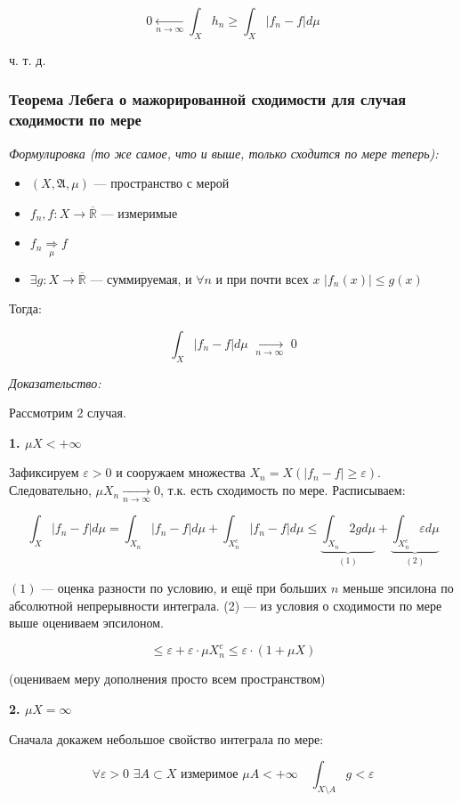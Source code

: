 \documentclass{article}
\def\dbl{\,\,}
\def\rinf{\overline{\mathbb{R}}}
\def\goesto#1{\underset{#1}{\longrightarrow}}
\def\toinf#1{\goesto{#1 \rightarrow \infty}}
\def\ntoinf{\toinf{n}}
\begin{document}
\[0 \underset{n \rightarrow \infty}{\longleftarrow} \int_{X} h_n \ge \int_{X} |f_n - f| d \mu\]

ч. т. д. 

\subsubsection{Теорема Лебега о мажорированной сходимости для случая сходимости по мере}
\textit{Формулировка (то же самое, что и выше, только сходится по мере теперь):}

\begin{itemize}
    \item $(X, \mathfrak{A}, \mu)$ --- пространство с мерой
    \item $f_n, f: X \rightarrow \rinf$ --- измеримые
    \item $f_n \underset{\mu}{\Longrightarrow} f$
    \item $\exists g: X \rightarrow \rinf$ --- суммируемая, и $\forall n$ и при почти всех $x \dbl |f_n(x)| \le g(x)$
\end{itemize}

Тогда:

\[\int_{X}|f_n - f| d \mu \dbl \ntoinf \dbl 0\]

\textit{Доказательство:}

Рассмотрим 2 случая.

\textbf{1. $\mu X < + \infty$}

Зафиксируем $\varepsilon > 0$ и сооружаем множества $X_n = X(|f_n - f| \ge \varepsilon)$. Следовательно, $\mu X_n \ntoinf 0$, т.к. есть сходимость по мере. Расписываем:

\[\int_{X} |f_n - f| d\mu = \int_{X_n} |f_n - f| d\mu + \int_{X^c_n} |f_n - f| d\mu \le \underbrace{\int_{X_n} 2g d\mu}_{(1)} + \underbrace{\int_{X^c_n} \varepsilon d\mu}_{(2)}\]

$(1)$ --- оценка разности по условию, и ещё при больших $n$ меньше эпсилона по абсолютной непрерывности интеграла. (2) --- из условия о сходимости по мере выше оцениваем эпсилоном.

\[\le \varepsilon + \varepsilon \cdot \mu X_n^c \le \varepsilon \cdot (1 + \mu X)\]

(оцениваем меру дополнения просто всем пространством)

\textbf{2. $\mu X = \infty$}

Сначала докажем небольшое свойство интеграла по мере:

\[\forall \varepsilon > 0 \dbl \exists A \subset X \text{ измеримое } \mu A < + \infty \quad \int_{X \setminus A} g < \varepsilon\]
\end{document}
